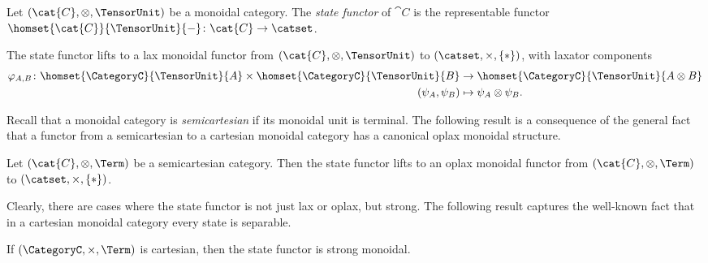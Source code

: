 %
%
\begin{definition}
    Let $(\cat{C}, \otimes, \TensorUnit)$ be a monoidal category.
    The \emph{state functor} of $\cat{C}$ is the representable functor $\homset{\cat{C}}{\TensorUnit}{-}\colon \cat{C} \to \catset$. 
\end{definition}
%
\begin{proposition}\label{prop: state functor lax}
    The state functor lifts to a lax monoidal functor from $(\cat{C}, \otimes, \TensorUnit)$ to $(\catset, \times, \{*\})$, with laxator components
    \begin{align*}
        \varphi_{A,B}\colon \homset{\CategoryC}{\TensorUnit}{A} \times \homset{\CategoryC}{\TensorUnit}{B}
            &\rightarrow 
            \homset{\CategoryC}{\TensorUnit}{A \otimes B}\\
        (\psi_A, \psi_B) 
            &\mapsto
            \psi_A \otimes \psi_B.
    \end{align*}
\end{proposition}
%
%
Recall that a monoidal category is \emph{semicartesian} if its monoidal unit is terminal.
The following result is a consequence of the general fact that a functor from a semicartesian to a cartesian monoidal category has a canonical oplax monoidal structure.
%
%
\begin{proposition}\label{prop: state functor oplax}
    Let $(\cat{C}, \otimes, \Term)$ be a semicartesian category.
    Then the state functor lifts to an oplax monoidal functor from $(\cat{C}, \otimes, \Term)$ to $(\catset, \times, \{*\})$.
\end{proposition}
%
Clearly, there are cases where the state functor is not just lax or oplax, but strong.
The following result captures the well-known fact that in a cartesian monoidal category every state is separable.
%
\begin{proposition}\label{prop: state functor strong}
    If $(\CategoryC, \times, \Term)$ is cartesian, then the state functor is strong monoidal.
\end{proposition}

